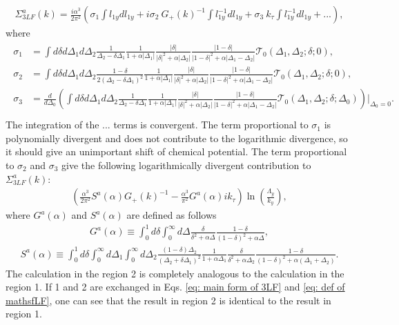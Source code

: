\documentclass[prx,amsmath,amssymb, notitlepage, onecolumn,
nofootinbib,
superscriptaddress,
longbibliography
]{revtex4-1}
\newcommand{\beq}{\begin{eqnarray}}
\newcommand{\eeq}{\end{eqnarray}}
\begin{document}
\beq
\Sigma_{3LF}^a(k) = \frac{i \alpha^3}{2\pi^2}\left(\sigma_1\int l_{1y} d l_{1y} + i\sigma_2~G_+(k)^{-1} \int l_{1y}^{-1} d l_{1y} + \sigma_3~ k_\tau \int l_{1y}^{-1} d l_{1y}+...\right),
\eeq
where
\beq
\begin{split}
\sigma_1 &= \int d\delta d\Delta_1 d\Delta_2\frac{1}{\Delta_2-\delta \Delta_1} \frac{1}{1 + \alpha|\Delta_1|}\frac{|\delta|}{|\delta|^{2} + \alpha|\Delta_2|}\frac{|1-\delta|}{|1-\delta|^{2} + \alpha|\Delta_1-\Delta_2|}\mathcal{T}_0(\Delta_1, \Delta_2;\delta; 0), \\
\sigma_2 &= \int d\delta d\Delta_1 d\Delta_2\frac{1-\delta}{2(\Delta_2-\delta \Delta_1)^2}\frac{1}{1 + \alpha|\Delta_1|}\frac{|\delta|}{|\delta|^{2} + \alpha|\Delta_2|}\frac{|1-\delta|}{|1-\delta|^{2} + \alpha|\Delta_1-\Delta_2|} \mathcal{T}_0(\Delta_1, \Delta_2;\delta; 0), \\
\sigma_3 &= \frac{d}{d\Delta_0}\left(\int d\delta d\Delta_1 d\Delta_2\frac{1}{\Delta_2-\delta \Delta_1}\frac{1}{1 + \alpha|\Delta_1|}\frac{|\delta|}{|\delta|^{2} + \alpha|\Delta_2|}\frac{|1-\delta|}{|1-\delta|^{2} + \alpha|\Delta_1-\Delta_2|} \mathcal{T}_0(\Delta_1, \Delta_2;\delta; \Delta_0)\right)\Bigg|_{\Delta_0=0}.\\
\end{split}
\eeq
%
The integration of the ... terms is convergent. The term proportional to $\sigma_1$ is polynomially divergent and does not contribute to the logarithmic divergence, so it should give an unimportant shift of chemical potential. The term proportional to $\sigma_2$ and $\sigma_3$ give the following logarithmically divergent contribution to $\Sigma^a_{3LF}(k)$:
\beq\label{eq: 3LF region 1}
\left(\frac{ \alpha^3}{2\pi^2} S^a(\alpha)G_+(k)^{-1}-\frac{ \alpha^3}{\pi^2} G^a(\alpha)i k_\tau\right)\ln\left(\frac{\Lambda_y}{k_y}\right),
\eeq
where $G^a(\alpha)$ and $S^a(\alpha)$ are defined as follows
\beq\label{eq: def of Ga}
G^a(\alpha) \equiv \int_0^1 d \delta \int_0^\infty d\Delta \frac{\delta}{\delta^2+\alpha\Delta}\frac{1-\delta}{(1-\delta)^2+\alpha\Delta},
\eeq
\beq\label{eq: def of Sa}
S^a(\alpha) \equiv \int_0^1 d \delta \int_0^\infty d \Delta_1 \int_0^\infty d \Delta_2 \frac{(1-\delta)\Delta_2}{(\Delta_2+\delta \Delta_1)^2}\frac{1}{1 + \alpha\Delta_1}\frac{\delta}{\delta^{2} + \alpha\Delta_2}\frac{1-\delta}{(1-\delta)^2 + \alpha(\Delta_1+\Delta_2)} .
\eeq
The calculation in the region 2 is completely analogous to the calculation in the region 1. 
If 1 and 2 are exchanged in Eqs. \eqref{eq: main form of 3LF} and \eqref{eq: def of mathsfLF}, one can see that the result in region 2 is identical to the result in region 1.
\end{document}

